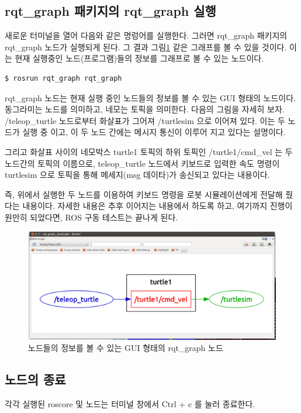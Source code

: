 \subsection{rqt\_graph 패키지의 rqt\_graph 실행}
새로운 터미널을 열어 다음와 같은 명렁어를 실행한다. 그러면 rqt\_graph 패키지의 rqt\_graph 노드가 실행되게 된다. 그 결과 그림\ref{fig:turtlesim_node_graph} 같은 그래프를 볼 수 있을 것이다. 이는 현재 실행중인 노드(프로그램)들의 정보를 그래프로 볼 수 있는 노드이다.
\\
\begin{lstlisting}[language=ROS]
$ rosrun rqt_graph rqt_graph
\end{lstlisting}

rqt\_graph 노드는 현재 실행 중인 노드들의 정보를 볼 수 있는 GUI 형태의 노드이다. 동그라미는 노드를 의미하고, 네모는 토픽을 의미한다. 다음의 그림을 자세히 보자. /teleop\_turtle 노드로부터 화살표가 그어져 /turtlesim 으로 이어져 있다. 이는 두 노드가 실행 중 이고, 이 두 노드 간에는 메시지 통신이 이루어 지고 있다는 설명이다. 

그리고 화살표 사이의 네모박스 turtle1 토픽의 하위 토픽인 /turtle1/cmd\_vel 는 두 노드간의 토픽의 이름으로, teleop\_turtle 노드에서 키보드로 입력한 속도 명령이 turtlesim 으로 토픽을 통해 메세지(msg 데이타)가 송신되고 있다는 내용이다. 

즉, 위에서 실행한 두 노드를 이용하여 키보드 명령을 로봇 시뮬레이션에게 전달해 줬다는 내용이다. 자세한 내용은 추후 이어지는 내용에서 하도록 하고, 여기까지 진행이 원만히 되었다면, ROS 구동 테스트는 끝나게 된다.

\begin{figure}[h]
\centering\includegraphics[width=0.8\columnwidth]{pictures/chapter2/turtlesim_node_graph.png}
\caption{노드들의 정보를 볼 수 있는 GUI 형태의 rqt\_graph 노드}
\label{fig:turtlesim_node_graph}
\end{figure}

\subsection{노드의 종료}

각각 실행된 roscore 및 노드는 터미널 창에서 Ctrl + c 를 눌러 종료한다.

